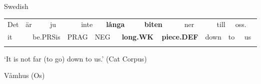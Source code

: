 \begin{listWWNumileveli}
\item 

\begin{styleExample}
Swedish

\end{styleExample}

\end{listWWNumileveli}

\begin{tabular}{llllllllllllllllll}
\lsptoprule
Det & \multicolumn{2}{l}{är

} & \multicolumn{2}{l}{ju

} & \multicolumn{2}{l}{inte

} & \multicolumn{2}{l}{{\bfseries långa}

} & \multicolumn{2}{l}{{\bfseries biten}

} & \multicolumn{2}{l}{ner

} & \multicolumn{2}{l}{till

} & \multicolumn{2}{l}{oss.

} & \\
\multicolumn{2}{l}{it

} & \multicolumn{2}{l}{be.PRSis

} & \multicolumn{2}{l}{PRAG

} & \multicolumn{2}{l}{NEG

} & \multicolumn{2}{l}{{\bfseries long.WK}

} & \multicolumn{2}{l}{{\bfseries piece.DEF}

} & \multicolumn{2}{l}{down

} & \multicolumn{2}{l}{to

} & \multicolumn{2}{l}{us

}\\
\lspbottomrule
\end{tabular}

\begin{styleTranslation}
‘It is not far (to go) down to us.’ (Cat Corpus)

\end{styleTranslation}

\begin{listWWNumileveli}
\item 

\begin{styleExample}
Våmhus (Os) 

\end{styleExample}

\end{listWWNumileveli}

